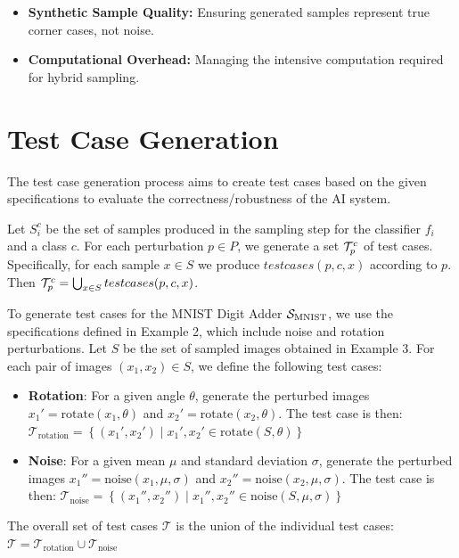 \begin{tcolorbox}[colback=purple!2!white, colframe=purple, title=Challenges in Sampling]
  \begin{itemize}
    \item \textbf{Synthetic Sample Quality:} Ensuring generated samples represent true corner cases, not noise.
    \item \textbf{Computational Overhead:} Managing the intensive computation required for hybrid sampling.
 
  \end{itemize}

\end{tcolorbox}


\section{Test Case Generation}

The test case generation process aims to create test cases based on the given specifications to evaluate the correctness/robustness of the AI system.

Let $S_i^c$ be the set of samples produced in the sampling step for the classifier $f_i$ and a class $c$. For each perturbation $p\in P$, we generate a set $\T_p^c$ of test cases. Specifically, for each sample $x\in S$ we produce $testcases(p,c,x)$ according to $p$. Then $\T_p^c = \bigcup_{x\in S} testcases(p,c,x)$.

\begin{example}
To generate test cases for the MNIST Digit Adder $\S_{\text{MNIST}}$, we use the specifications defined in Example 2, which include noise and rotation perturbations. Let $S$ be the set of sampled images obtained in Example 3. For each pair of images $(x_1, x_2) \in S$, we define the following test cases:
\begin{itemize}
    \item \textbf{Rotation}: For a given angle $\theta$, generate the perturbed images $x_1' = \text{rotate}(x_1, \theta)$ and $x_2' = \text{rotate}(x_2, \theta)$. The test case is then:
    $\mathcal{T}_{\text{rotation}} = \left\{(x_1', x_2') \mid x_1', x_2' \in \text{rotate}(S, \theta)\right\}$
    \item \textbf{Noise}: For a given mean $\mu$ and standard deviation $\sigma$, generate the perturbed images $x_1'' = \text{noise}(x_1, \mu, \sigma)$ and $x_2'' = \text{noise}(x_2, \mu, \sigma)$. The test case is then:
    $\mathcal{T}_{\text{noise}} = \left\{(x_1'', x_2'') \mid x_1'', x_2'' \in \text{noise}(S, \mu, \sigma)\right\}$
\end{itemize}
The overall set of test cases $\mathcal{T}$ is the union of the individual test cases:
$\mathcal{T} = \mathcal{T}_{\text{rotation}} \cup \mathcal{T}_{\text{noise}}$
\end{example}

